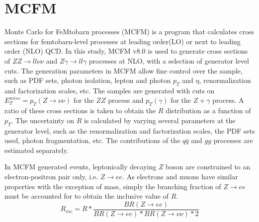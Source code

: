 \documentclass[11pt,a4paper,openright,twoside]{report}
\newcommand{\ZZ}{$ZZ\to ll\nu\nu$ }
\newcommand{\Zg}{$Z\gamma\to ll\gamma$ }
\begin{document}
\section{MCFM}
Monte Carlo for FeMtobarn processes (MCFM) is a program that calculates cross sections for femtobarn-level processes at leading order(LO) or next to leading order (NLO) QCD. In this study, MCFM v8.0 \cite{MCFM1, MCFM2, MCFM3, MCFM} is used to generate cross sections of \ZZ and \Zg processes at NLO, with a selection of generator level cuts. The generation parameters in MCFM allow fine control over the sample, such as PDF sets, photon isolation, lepton and photon $p_T$ and $\eta$, renormalization and factorization scales, etc. The samples are generated with cuts on $E_T^{miss} = p_T(Z\to \nu\nu)$ for the $ZZ$ process and $p_T(\gamma)$ for the $Z+\gamma$ process. A ratio of these cross sections is taken to obtain the $R$ distribution as a function of $p_T$. The uncertainty on $R$ is calculated by varying several parameters at the generator level, such as the renormalization and factorization scales, the PDF sets used, photon fragmentation, etc. The contributions of the $q \bar{q}$ and $gg$ processes are estimated separately.

In MCFM generated events, leptonically decaying $Z$ boson are constrained to an electron-positron pair only, i.e. $Z\to ee$. As electrons and muons have similar properties with the exception of mass, simply the branching fraction of $Z\rightarrow ee$ must be accounted for to obtain the inclusive value of $R$.
\begin{equation}\label{eq:R_inc}
	R_{inc} = R * \frac{BR(Z\rightarrow ee)}{BR(Z \rightarrow ee)*BR(Z\rightarrow \nu\nu)*2}
\end{equation}
\end{document}
